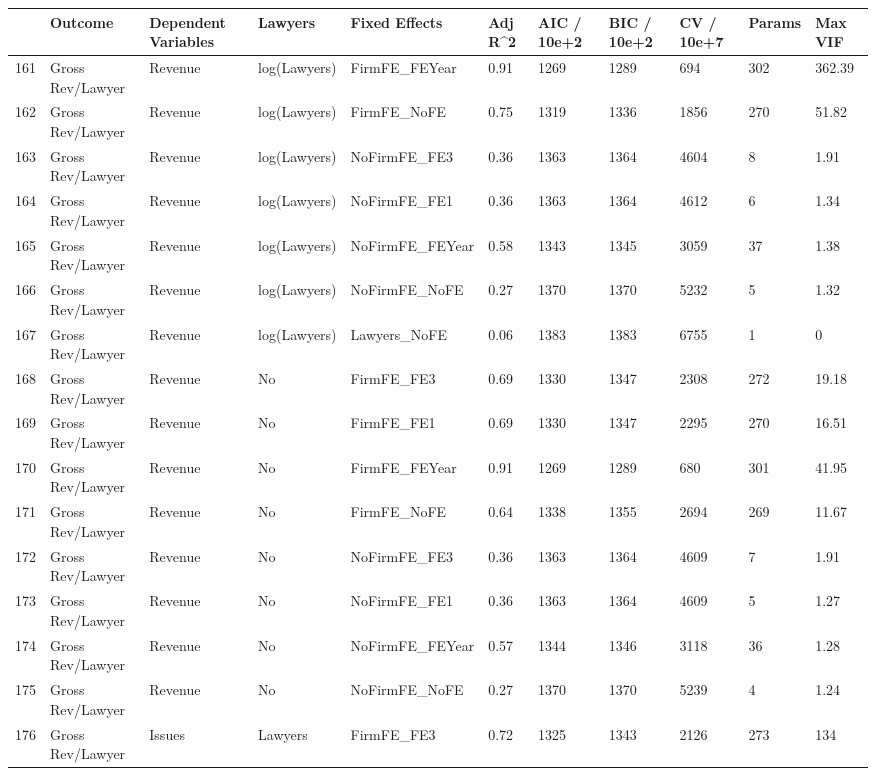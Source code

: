 \begin{table}[ht]
\centering
\begin{tabular}{rllllllllll}
  \hline
 & Outcome & Dependent Variables & Lawyers & Fixed Effects & Adj R^2 & AIC / 10e+2 & BIC / 10e+2 & CV / 10e+7 & Params & Max VIF \\ 
  \hline
161 & Gross Rev/Lawyer & Revenue & log(Lawyers) & FirmFE\_FEYear & 0.91 & 1269 & 1289 & 694 & 302 & 362.39 \\ 
  162 & Gross Rev/Lawyer & Revenue & log(Lawyers) & FirmFE\_NoFE & 0.75 & 1319 & 1336 & 1856 & 270 & 51.82 \\ 
  163 & Gross Rev/Lawyer & Revenue & log(Lawyers) & NoFirmFE\_FE3 & 0.36 & 1363 & 1364 & 4604 & 8 & 1.91 \\ 
  164 & Gross Rev/Lawyer & Revenue & log(Lawyers) & NoFirmFE\_FE1 & 0.36 & 1363 & 1364 & 4612 & 6 & 1.34 \\ 
  165 & Gross Rev/Lawyer & Revenue & log(Lawyers) & NoFirmFE\_FEYear & 0.58 & 1343 & 1345 & 3059 & 37 & 1.38 \\ 
  166 & Gross Rev/Lawyer & Revenue & log(Lawyers) & NoFirmFE\_NoFE & 0.27 & 1370 & 1370 & 5232 & 5 & 1.32 \\ 
  167 & Gross Rev/Lawyer & Revenue & log(Lawyers) & Lawyers\_NoFE & 0.06 & 1383 & 1383 & 6755 & 1 & 0 \\ 
  168 & Gross Rev/Lawyer & Revenue & No & FirmFE\_FE3 & 0.69 & 1330 & 1347 & 2308 & 272 & 19.18 \\ 
  169 & Gross Rev/Lawyer & Revenue & No & FirmFE\_FE1 & 0.69 & 1330 & 1347 & 2295 & 270 & 16.51 \\ 
  170 & Gross Rev/Lawyer & Revenue & No & FirmFE\_FEYear & 0.91 & 1269 & 1289 & 680 & 301 & 41.95 \\ 
  171 & Gross Rev/Lawyer & Revenue & No & FirmFE\_NoFE & 0.64 & 1338 & 1355 & 2694 & 269 & 11.67 \\ 
  172 & Gross Rev/Lawyer & Revenue & No & NoFirmFE\_FE3 & 0.36 & 1363 & 1364 & 4609 & 7 & 1.91 \\ 
  173 & Gross Rev/Lawyer & Revenue & No & NoFirmFE\_FE1 & 0.36 & 1363 & 1364 & 4609 & 5 & 1.27 \\ 
  174 & Gross Rev/Lawyer & Revenue & No & NoFirmFE\_FEYear & 0.57 & 1344 & 1346 & 3118 & 36 & 1.28 \\ 
  175 & Gross Rev/Lawyer & Revenue & No & NoFirmFE\_NoFE & 0.27 & 1370 & 1370 & 5239 & 4 & 1.24 \\ 
  176 & Gross Rev/Lawyer & Issues & Lawyers & FirmFE\_FE3 & 0.72 & 1325 & 1343 & 2126 & 273 & 134 \\ 

\end{tabular}
\end{table}
